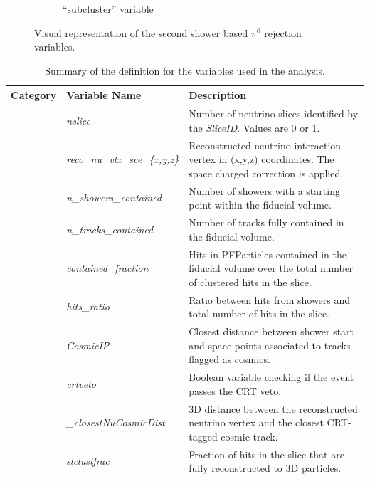 \begin{figure}[H]
\begin{center}
\begin{subfigure}[b]{0.35\textwidth}
    \caption{\label{fig:nue:variables:secondshower} ``subcluster'' variable }
    \end{subfigure}
\caption{\label{fig:nue:variables:secondshower} Visual representation of the second shower based $\pi^0$ rejection variables.}
\end{center}
\end{figure}

\begin{table}[ht]
\caption{\label{tab:variableSummary} Summary of the definition for the variables used in the analysis.}
\centering
\begin{tabular}{ m{} | m{} | m{}  }
Category & Variable Name & Description  \\
\hline

\multicolumn{1}{l|}{} & \emph{nslice} &  Number of neutrino slices identified by the \emph{SliceID}. Values are  0 or 1.\\  \cline{2-3}
\multicolumn{1}{l|}{} & \emph{reco\_nu\_vtx\_sce\_\{x,y,z\}} & Reconstructed neutrino interaction vertex in (x,y,z) coordinates. The space charged correction is applied.  \\  \cline{2-3}
\multicolumn{1}{l|}{} & \emph{n\_showers\_contained} & Number of showers with a starting point within the fiducial volume. \\  \cline{2-3}
\multicolumn{1}{l|}{} & \emph{n\_tracks\_contained} & Number of tracks fully contained in the fiducial volume.  \\  \cline{2-3}
\multicolumn{1}{l|}{} & \emph{contained\_fraction} & Hits in PFParticles contained in the fiducial volume over the total number of clustered hits in the slice.  \\  \cline{2-3}
\parbox[t]{2mm}{} & \emph{hits\_ratio} & Ratio between hits from showers and total number of hits in the slice. \\  
 & \emph{CosmicIP} & Closest distance between shower start and space points associated to tracks flagged as cosmics. \\  
 & \emph{crtveto} & Boolean variable checking if the event passes the CRT veto. \\  
 & \emph{\_closestNuCosmicDist} &  3D distance between the reconstructed neutrino vertex and the closest CRT-tagged cosmic track. \\  
 & \emph{slclustfrac} & Fraction of hits in the slice that are fully reconstructed to 3D particles. \\  
\hline


\end{tabular}
\end{table}
